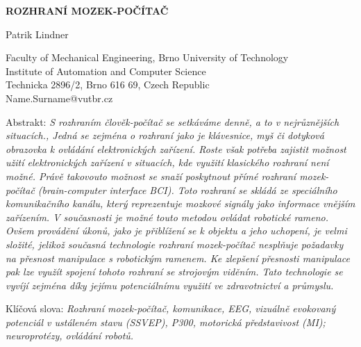 \documentclass[a4paper,10pt]{article}
\theoremstyle{definition}
\begin{document}
\pagestyle{empty}

\begin{center}
{\bf \Large ROZHRANÍ MOZEK-POČÍTAČ}
\end{center}

\smallskip
\begin{center}
{\large Patrik Lindner}
\end{center}

\smallskip
\begin{center}
Faculty of Mechanical Engineering, Brno University of Technology\\
Institute of Automation and Computer Science\\
Technicka 2896/2, Brno 616 69, Czech Republic\\
Name.Surname@vutbr.cz\\
\end{center}

\bigskip
\noindent Abstrakt: \textit{S rozhraním člověk-počítač se setkáváme denně, a to v nejrůznějších situacích., Jedná se zejména o rozhraní jako je klávesnice, myš či dotyková obrazovka k ovládání elektronických zařízení. Roste však potřeba zajistit možnost užití elektronických zařízení v situacích, kde využití klasického rozhraní není možné. Právě takovouto možnost se snaží poskytnout přímé rozhraní mozek-počítač (brain-computer interface BCI). Toto rozhraní se skládá ze speciálního komunikačního kanálu, který reprezentuje mozkové signály jako informace vnějším zařízením. V současnosti je možné touto metodou ovládat robotické rameno. Ovšem provádění úkonů, jako je přiblížení se k objektu a jeho uchopení, je velmi složité, jelikož současná technologie rozhraní mozek-počítač nesplňuje požadavky na přesnost manipulace s robotickým ramenem. Ke zlepšení přesnosti manipulace pak lze využít spojení tohoto rozhraní se strojovým viděním. Tato technologie se vyvíjí zejména díky jejímu potenciálnímu využití ve zdravotnictví a průmyslu.}

\vspace*{10pt} \noindent Klíčová slova: \textit{Rozhraní mozek-počítač, komunikace, EEG, vizuálně evokovaný potenciál v ustáleném stavu (SSVEP), P300, motorická představivost (MI); neuroprotézy, ovládání robotů.}

\bigskip
\end{document}
